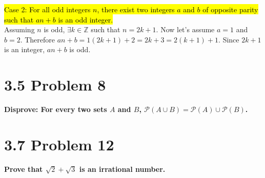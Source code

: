 \documentclass[10pt]{article}
\def \n {\par \vspace{\baselineskip}}
\begin{document}
\n\hl{Case 2: For all odd integers $n$, there exist two integers $a$ and $b$ of opposite parity such that $an + b$ is an odd integer.} \\
Assuming $n$ is odd, $\exists k \in \mathbb{Z}$ such that $n = 2k + 1$.  Now let's assume $a = 1$ and $b = 2$.
Therefore $an + b = 1(2k + 1) + 2 = 2k + 3 = 2(k + 1) + 1$.  Since $2k + 1$ is an integer, $an + b$ is odd.


\section{3.5 Problem 8}
\textbf{Disprove: For every two sets $A$ and $B$, $\mathcal{P}(A \cup B) = \mathcal{P}(A) \cup \mathcal{P}(B)$.}


\section{3.7 Problem 12}
\textbf{Prove that $\sqrt{2} + \sqrt{3}$ is an irrational number.}
\end{document}
